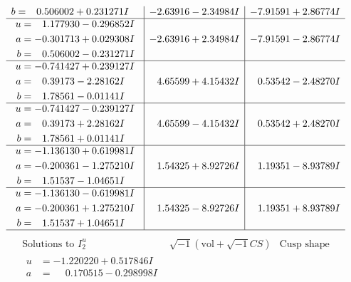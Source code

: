 \documentclass[1p]{elsarticle_modified}
\theoremstyle{definition}
\newcommand{\I}{\sqrt{-1}}
\begin{document}
$$\begin{array}{c|c|c}
\begin{aligned}
b &= \phantom{-}0.506002 + 0.231271 I\end{aligned}
 & -2.63916 - 2.34984 I & -7.91591 + 2.86774 I \\ \hline\begin{aligned}
u &= \phantom{-}1.177930 - 0.296852 I \\
a &= -0.301713 + 0.029308 I \\
b &= \phantom{-}0.506002 - 0.231271 I\end{aligned}
 & -2.63916 + 2.34984 I & -7.91591 - 2.86774 I \\ \hline\begin{aligned}
u &= -0.741427 + 0.239127 I \\
a &= \phantom{-}0.39173 - 2.28162 I \\
b &= \phantom{-}1.78561 - 0.01141 I\end{aligned}
 & \phantom{-}4.65599 + 4.15432 I & \phantom{-}0.53542 - 2.48270 I \\ \hline\begin{aligned}
u &= -0.741427 - 0.239127 I \\
a &= \phantom{-}0.39173 + 2.28162 I \\
b &= \phantom{-}1.78561 + 0.01141 I\end{aligned}
 & \phantom{-}4.65599 - 4.15432 I & \phantom{-}0.53542 + 2.48270 I \\ \hline\begin{aligned}
u &= -1.136130 + 0.619981 I \\
a &= -0.200361 - 1.275210 I \\
b &= \phantom{-}1.51537 - 1.04651 I\end{aligned}
 & \phantom{-}1.54325 + 8.92726 I & \phantom{-}1.19351 - 8.93789 I \\ \hline\begin{aligned}
u &= -1.136130 - 0.619981 I \\
a &= -0.200361 + 1.275210 I \\
b &= \phantom{-}1.51537 + 1.04651 I\end{aligned}
 & \phantom{-}1.54325 - 8.92726 I & \phantom{-}1.19351 + 8.93789 I\\
 \hline 
 \end{array}$$\newpage$$\begin{array}{c|c|c}  
\text{Solutions to }I^u_{2}& \I (\text{vol} + \sqrt{-1}CS) & \text{Cusp shape}\\
 \hline 
\begin{aligned}
u &= -1.220220 + 0.517846 I \\
a &= \phantom{-}0.170515 - 0.298998 I \\

\end{aligned}
\end{array}$$
\end{document}
